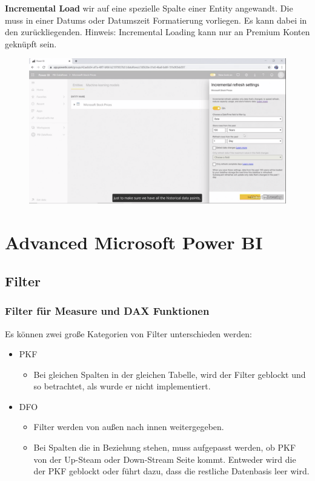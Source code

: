 \textbf{Incremental Load} wir auf eine spezielle Spalte einer Entity angewandt. Die muss in einer Datums oder Datumszeit Formatierung vorliegen. Es kann dabei in den zurückliegenden.
Hinweis: Incremental Loading kann nur an Premium Konten geknüpft sein.
\begin{figure}[H]
	\centering
	\includegraphics[scale = 0.3]{attachment/chapter_1/Scc145}
\end{figure}


\section{Advanced Microsoft Power BI}
\subsection{Filter}
\subsubsection{Filter für Measure und DAX Funktionen}
Es können zwei große Kategorien von Filter unterschieden werden:
\begin{itemize}
	\item \gls{PKF}
	\begin{itemize}
		\item Bei gleichen Spalten in der gleichen Tabelle, wird der Filter geblockt und so betrachtet, als wurde er nicht implementiert.
	\end{itemize}
	\item \gls{DFO}
	\begin{itemize}
		\item Filter werden von außen nach innen weitergegeben.
		\item Bei Spalten die in Beziehung stehen, muss aufgepasst werden, ob \gls{PKF} von der Up-Steam oder Down-Stream Seite kommt. Entweder wird die der \gls{PKF} geblockt oder führt dazu, dass die restliche Datenbasis leer wird.
	\end{itemize}
\end{itemize}

